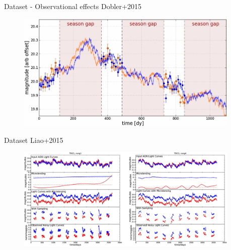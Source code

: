 \documentclass[9pt]{beamer}
\begin{document}
\begin{frame}{Dataset - Observational effects}
\hspace{0.82\textwidth}\small{Dobler+2015}
\begin{figure}
\includegraphics[width=0.95\textwidth]{dataset-season-gap.jpg}
\end{figure}
\end{frame}

\begin{frame}{Dataset}
  \hspace{0.85\textwidth}\small{Liao+2015}
  \begin{figure}
    \includegraphics[width=0.95\textwidth]{dataset-total.jpg}
  \end{figure}
\end{frame}
\end{document}
